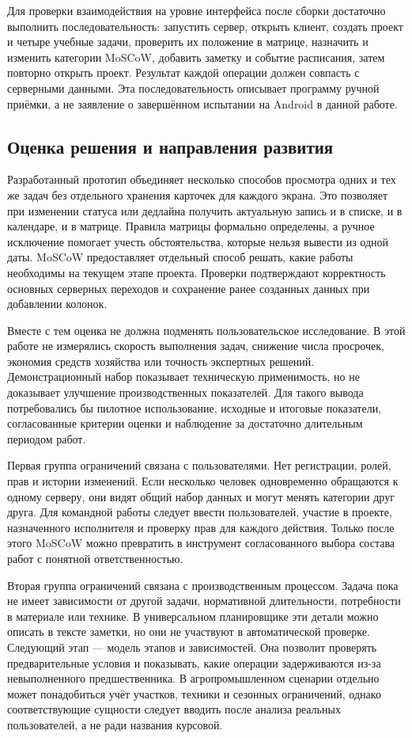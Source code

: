 \documentclass[14pt,a4paper]{extarticle}
\begin{document}
Для проверки взаимодействия на уровне интерфейса после сборки достаточно выполнить последовательность: запустить сервер, открыть клиент, создать проект и четыре учебные задачи, проверить их положение в матрице, назначить и изменить категории MoSCoW, добавить заметку и событие расписания, затем повторно открыть проект. Результат каждой операции должен совпасть с серверными данными. Эта последовательность описывает программу ручной приёмки, а не заявление о завершённом испытании на Android в данной работе.

\subsection{Оценка решения и направления развития}

Разработанный прототип объединяет несколько способов просмотра одних и тех же задач без отдельного хранения карточек для каждого экрана. Это позволяет при изменении статуса или дедлайна получить актуальную запись и в списке, и в календаре, и в матрице. Правила матрицы формально определены, а ручное исключение помогает учесть обстоятельства, которые нельзя вывести из одной даты. MoSCoW предоставляет отдельный способ решать, какие работы необходимы на текущем этапе проекта. Проверки подтверждают корректность основных серверных переходов и сохранение ранее созданных данных при добавлении колонок.

Вместе с тем оценка не должна подменять пользовательское исследование. В этой работе не измерялись скорость выполнения задач, снижение числа просрочек, экономия средств хозяйства или точность экспертных решений. Демонстрационный набор показывает техническую применимость, но не доказывает улучшение производственных показателей. Для такого вывода потребовались бы пилотное использование, исходные и итоговые показатели, согласованные критерии оценки и наблюдение за достаточно длительным периодом работ.

Первая группа ограничений связана с пользователями. Нет регистрации, ролей, прав и истории изменений. Если несколько человек одновременно обращаются к одному серверу, они видят общий набор данных и могут менять категории друг друга. Для командной работы следует ввести пользователей, участие в проекте, назначенного исполнителя и проверку прав для каждого действия. Только после этого MoSCoW можно превратить в инструмент согласованного выбора состава работ с понятной ответственностью.

Вторая группа ограничений связана с производственным процессом. Задача пока не имеет зависимости от другой задачи, нормативной длительности, потребности в материале или технике. В универсальном планировщике эти детали можно описать в тексте заметки, но они не участвуют в автоматической проверке. Следующий этап --- модель этапов и зависимостей. Она позволит проверять предварительные условия и показывать, какие операции задерживаются из-за невыполненного предшественника. В агропромышленном сценарии отдельно может понадобиться учёт участков, техники и сезонных ограничений, однако соответствующие сущности следует вводить после анализа реальных пользователей, а не ради названия курсовой.
\end{document}

